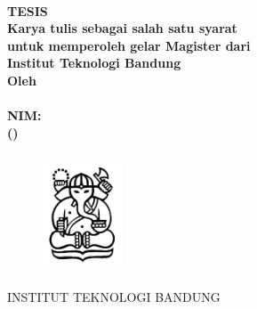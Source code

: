 \begin{titlepage}
  \label{chp:judul}
  \centering\bfseries\large
  \MakeUppercase{\titlename} \\
  TESIS \\
  \vspace{\baselineskip}
  \normalsize Karya tulis sebagai salah satu syarat \\
  untuk memperoleh gelar Magister dari \\
  Institut Teknologi Bandung\\
  Oleh \\ \large
  \MakeUppercase{\authorname} \\
  NIM: \authorid \\
  (\department) \\
  \begin{figure}[!h]
    \centering
    \includegraphics[width=2.35cm,height=3.5cm]{gbr/gajah.jpg}
  \end{figure}
  INSTITUT TEKNOLOGI BANDUNG \\
  \completiondate
\end{titlepage}